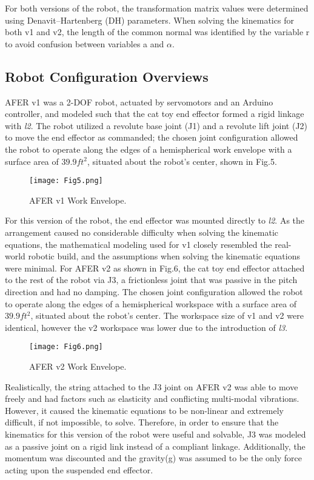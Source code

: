 For both versions of the robot, the transformation matrix values were determined using Denavit–Hartenberg (DH) parameters. When solving the kinematics for both v1 and v2, the length of the common normal was identified by the variable r to avoid confusion between variables a and $\alpha$. 

\subsection{Robot Configuration Overviews}
AFER v1 was a 2-DOF robot, actuated by servomotors and an Arduino controller, and modeled such that the cat toy end effector formed a rigid linkage with \textit{l2}. The robot utilized a revolute base joint (J1) and a revolute lift joint (J2) to move the end effector as commanded; the chosen joint configuration allowed the robot to operate along the edges of a hemispherical work envelope with a surface area of $39.9ft^2$, situated about the robot’s center, shown in Fig.5.

\begin{figure}[h!]
\texttt{[image: Fig5.png]}
\caption{AFER v1 Work Envelope.}
\label{fig5}
\end{figure}

For this version of the robot, the end effector was mounted directly to \textit{l2}. As the arrangement caused no considerable difficulty when solving the kinematic equations, the mathematical modeling used for v1 closely resembled the real-world robotic build, and the assumptions when solving the kinematic equations were minimal. 
For AFER v2 as shown in Fig.6, the cat toy end effector attached to the rest of the robot via J3, a frictionless joint that was passive in the pitch direction and had no damping. The chosen joint configuration allowed the robot to operate along the edges of a hemispherical workspace with a surface area of $39.9 ft^2$, situated about the robot’s center. The workspace size of v1 and v2 were identical, however the v2 workspace was lower due to the introduction of \textit{l3}. 


\begin{figure}[h!]
\texttt{[image: Fig6.png]}
\caption{AFER v2 Work Envelope.}
\label{fig6}
\end{figure}

Realistically, the string attached to the J3 joint on AFER v2 was able to move freely and had factors such as elasticity and conflicting multi-modal vibrations. However, it caused the kinematic equations to be non-linear and extremely difficult, if not impossible, to solve. Therefore, in order to ensure that the kinematics for this version of the robot were useful and solvable, J3 was modeled as a passive joint on a rigid link instead of a compliant linkage. Additionally, the momentum was discounted and the gravity(g) was assumed to be the only force acting upon the suspended end effector. 

